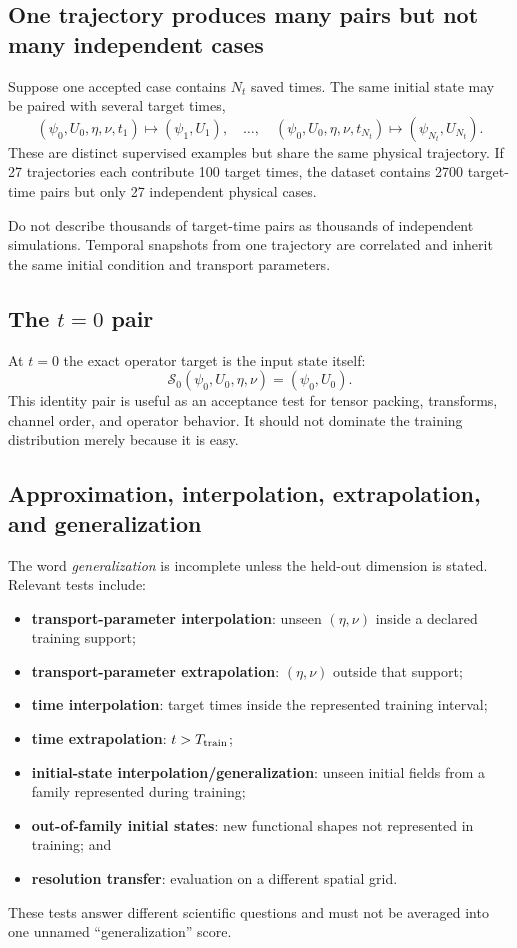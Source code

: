 \documentclass[11pt]{article}
\begin{document}
\subsection{One trajectory produces many pairs but not many independent cases}
Suppose one accepted case contains $N_t$ saved times. The same initial state may be paired with several target times,
\[
(\psi_0,U_0,\eta,\nu,t_1)\mapsto(\psi_1,U_1),\quad \ldots,\quad
(\psi_0,U_0,\eta,\nu,t_{N_t})\mapsto(\psi_{N_t},U_{N_t}).
\]
These are distinct supervised examples but share the same physical trajectory. If 27 trajectories each contribute 100 target times, the dataset contains 2700 target-time pairs but only 27 independent physical cases.

\begin{warningbox}
Do not describe thousands of target-time pairs as thousands of independent simulations. Temporal snapshots from one trajectory are correlated and inherit the same initial condition and transport parameters.
\end{warningbox}

\subsection{The $t=0$ pair}
At $t=0$ the exact operator target is the input state itself:
\[
\mathcal{S}_{0}(\psi_0,U_0,\eta,\nu)=(\psi_0,U_0).
\]
This identity pair is useful as an acceptance test for tensor packing, transforms, channel order, and operator behavior. It should not dominate the training distribution merely because it is easy.

\subsection{Approximation, interpolation, extrapolation, and generalization}
The word \emph{generalization} is incomplete unless the held-out dimension is stated. Relevant tests include:
\begin{itemize}
  \item \textbf{transport-parameter interpolation}: unseen $(\eta,\nu)$ inside a declared training support;
  \item \textbf{transport-parameter extrapolation}: $(\eta,\nu)$ outside that support;
  \item \textbf{time interpolation}: target times inside the represented training interval;
  \item \textbf{time extrapolation}: $t>T_{\rm train}$;
  \item \textbf{initial-state interpolation/generalization}: unseen initial fields from a family represented during training;
  \item \textbf{out-of-family initial states}: new functional shapes not represented in training; and
  \item \textbf{resolution transfer}: evaluation on a different spatial grid.
\end{itemize}
These tests answer different scientific questions and must not be averaged into one unnamed ``generalization'' score.
\end{document}
